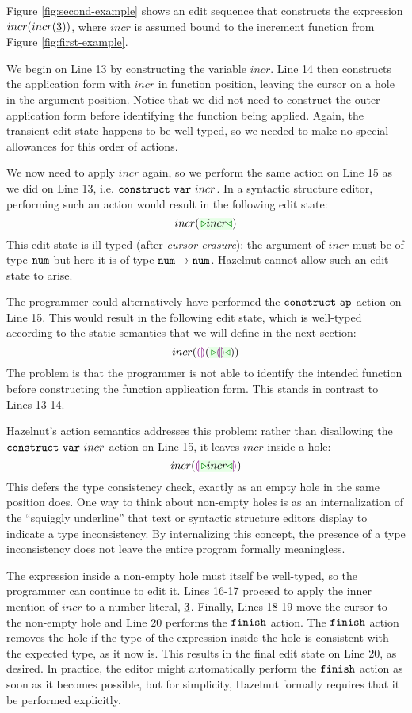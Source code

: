 Figure \ref{fig:second-example} shows an edit sequence that constructs the expression $incr(incr(\underline{3}))$, where $incr$ is assumed bound to the increment function from Figure \ref{fig:first-example}.

We begin on Line 13 by constructing the variable $incr$. Line 14 then constructs the application form with $incr$ in function position, leaving the cursor on a hole in the argument position. Notice that we did not need to construct the outer application form before identifying the function being applied. Again, the transient edit state happens to be well-typed, so we needed to make no special allowances for this order of actions.

We now need to apply $incr$ again, so we perform the same action on Line 15 as we did on Line 13, i.e. $\mathtt{construct}~\mathtt{var}~incr$. In a syntactic structure editor, performing such an action would result in the following edit state: 
\[
incr(\zwsel{incr})
\]
This edit state is ill-typed (after \emph{cursor erasure}): the argument of $incr$ must be of type $\texttt{num}$ but here it is of type $\texttt{num} \rightarrow \texttt{num}$. Hazelnut cannot allow such an edit state to arise. 

The programmer could alternatively have performed the $\mathtt{construct}~\mathtt{ap}$ action on Line 15. This would result in the following edit state, which is well-typed according to the static semantics that we will define in the next section:
\[
incr(\hhole{}(\zwsel{\hhole{}}))
\]
The problem is that the programmer is not able to identify the intended function before constructing the function application form. This stands in contrast to Lines 13-14. %

Hazelnut's action semantics addresses this problem: rather than disallowing the $\mathtt{construct}~\mathtt{var}~incr$ action on Line 15, it leaves $incr$ inside a hole:
\[
incr(\hhole{\zwsel{incr}})
\]
This defers the type consistency check, exactly as an empty hole in the same position does. One way to think about non-empty holes is as an internalization of the ``squiggly underline'' that text or syntactic structure editors display to indicate a type inconsistency. By internalizing this concept, the presence of a type inconsistency does not leave the entire program formally meaningless.

The expression inside a non-empty hole must itself be well-typed, so the programmer can continue to edit it. Lines 16-17 proceed to apply the inner mention of $incr$ to a number literal, $\underline{3}$. Finally, Lines 18-19 move the cursor to the non-empty hole and Line 20 performs the $\mathtt{finish}$ action. The $\mathtt{finish}$ action removes the hole if the type of the expression inside the hole is consistent with the expected type, as it now is. This results in the final edit state on Line 20, as desired. In practice, the editor might automatically perform the $\mathtt{finish}$ action as soon as it becomes possible, but for simplicity, Hazelnut formally requires that it be performed explicitly.

